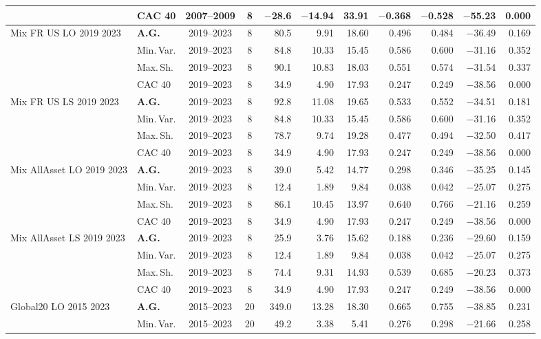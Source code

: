 \begin{longtable}{p{2.6cm} l c c r r r r r r r}
 & CAC 40 & 2007--2009 & 8 & $-$28.6 & $-$14.94 & 33.91 & $-$0.368 & $-$0.528 & $-$55.23 & 0.000 \\
\midrule
Mix FR US LO 2019 2023 & \textbf{A.G.} & 2019--2023 & 8 & 80.5 & 9.91 & 18.60 & 0.496 & 0.484 & $-$36.49 & 0.169 \\
 & Min.\,Var. & 2019--2023 & 8 & 84.8 & 10.33 & 15.45 & 0.586 & 0.600 & $-$31.16 & 0.352 \\
 & Max.\,Sh. & 2019--2023 & 8 & 90.1 & 10.83 & 18.03 & 0.551 & 0.574 & $-$31.54 & 0.337 \\
 & CAC 40 & 2019--2023 & 8 & 34.9 & 4.90 & 17.93 & 0.247 & 0.249 & $-$38.56 & 0.000 \\
\midrule
Mix FR US LS 2019 2023 & \textbf{A.G.} & 2019--2023 & 8 & 92.8 & 11.08 & 19.65 & 0.533 & 0.552 & $-$34.51 & 0.181 \\
 & Min.\,Var. & 2019--2023 & 8 & 84.8 & 10.33 & 15.45 & 0.586 & 0.600 & $-$31.16 & 0.352 \\
 & Max.\,Sh. & 2019--2023 & 8 & 78.7 & 9.74 & 19.28 & 0.477 & 0.494 & $-$32.50 & 0.417 \\
 & CAC 40 & 2019--2023 & 8 & 34.9 & 4.90 & 17.93 & 0.247 & 0.249 & $-$38.56 & 0.000 \\
\midrule
Mix AllAsset LO 2019 2023 & \textbf{A.G.} & 2019--2023 & 8 & 39.0 & 5.42 & 14.77 & 0.298 & 0.346 & $-$35.25 & 0.145 \\
 & Min.\,Var. & 2019--2023 & 8 & 12.4 & 1.89 & 9.84 & 0.038 & 0.042 & $-$25.07 & 0.275 \\
 & Max.\,Sh. & 2019--2023 & 8 & 86.1 & 10.45 & 13.97 & 0.640 & 0.766 & $-$21.16 & 0.259 \\
 & CAC 40 & 2019--2023 & 8 & 34.9 & 4.90 & 17.93 & 0.247 & 0.249 & $-$38.56 & 0.000 \\
\midrule
Mix AllAsset LS 2019 2023 & \textbf{A.G.} & 2019--2023 & 8 & 25.9 & 3.76 & 15.62 & 0.188 & 0.236 & $-$29.60 & 0.159 \\
 & Min.\,Var. & 2019--2023 & 8 & 12.4 & 1.89 & 9.84 & 0.038 & 0.042 & $-$25.07 & 0.275 \\
 & Max.\,Sh. & 2019--2023 & 8 & 74.4 & 9.31 & 14.93 & 0.539 & 0.685 & $-$20.23 & 0.373 \\
 & CAC 40 & 2019--2023 & 8 & 34.9 & 4.90 & 17.93 & 0.247 & 0.249 & $-$38.56 & 0.000 \\
\midrule
Global20 LO 2015 2023 & \textbf{A.G.} & 2015--2023 & 20 & 349.0 & 13.28 & 18.30 & 0.665 & 0.755 & $-$38.85 & 0.231 \\
 & Min.\,Var. & 2015--2023 & 20 & 49.2 & 3.38 & 5.41 & 0.276 & 0.298 & $-$21.66 & 0.258 \\

\end{longtable}
